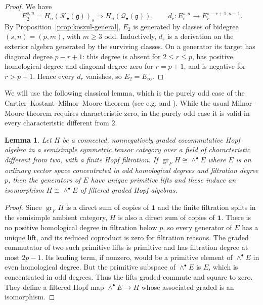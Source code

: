 \documentclass[12pt]{amsart}
\newtheorem{lemma}[theorem]{Lemma}
\theoremstyle{remark}
\DeclareMathOperator{\gr}{gr}
\newcommand{\g}{\mathfrak g}
\newcommand{\one}{\mathbf 1}
\newcommand{\cK}{\mathcal K}
\newcommand{\cQ}{\mathcal Q}
\begin{document}
\begin{proof}
We have
\[
 E_2^{s,n}=H_n(\cK_\bullet(\g))_s
 \Longrightarrow H_n(\cQ_\bullet(\g)),
 \qquad
 d_r:E_r^{s,n}\longrightarrow E_r^{s-r+1,n-1}.
\]
By Proposition~\ref{prop:koszul-general}, $E_2$ is generated by classes of
bidegree $(s,n)=(p,m)$, with $m\geq3$ odd.  Inductively, $d_r$ is a
derivation on the exterior algebra generated by the surviving classes.  On a
generator its target has diagonal degree $p-r+1$: this degree is absent for
$2\leq r\le p$, has positive homological degree and diagonal degree zero for
$r=p+1$, and is negative for $r>p+1$.  Hence every $d_r$ vanishes, so
$E_2=E_\infty$.
\end{proof}

We will use the following classical lemma, which is the purely odd case of the Cartier--Kostant--Milnor--Moore theorem (see e.g. \cite[Theorem~3.9]{Mas12} and \cite[Proposition~3.4]{MS17}).
While the usual Milnor--Moore theorem requires characteristic zero, in the purely odd case it is valid in every characteristic different from $2$.

\begin{lemma}\label{lem:hopf-rigidity}
Let $H$ be a connected, nonnegatively graded cocommutative Hopf algebra in a
semisimple symmetric tensor category over a field of characteristic different from two,
with a finite Hopf filtration.  If
$\gr_FH\cong\wedge^\bullet E$
where $E$ is an ordinary vector space concentrated in odd homological degrees
and filtration degree $p$, then the generators of $E$ have unique primitive
lifts and these induce an isomorphism $H\cong\wedge^\bullet E$
of filtered graded Hopf algebras.
\end{lemma}

\begin{proof}
Since $\gr_FH$ is a direct sum of copies of $\one$ and the finite filtration splits in the semisimple ambient category, $H$ is also a direct sum of copies of $\one$. There is no positive homological degree in filtration below $p$, so every
generator of $E$ has a unique lift, and its reduced coproduct is zero for
filtration reasons.  The graded commutator of two such primitive lifts is
primitive and has filtration degree at most $2p-1$.  Its leading term, if nonzero,
would be a primitive element of $\wedge^\bullet E$ in even homological degree.  But
the primitive subspace of $\wedge^\bullet E$ is $E$, which is concentrated in odd
degrees.  Thus the lifts graded-commute and square to zero.  They define a
filtered Hopf map $\wedge^\bullet E\to H$ whose associated graded is an
isomorphism.
\end{proof}
\end{document}
